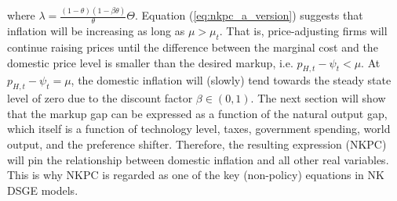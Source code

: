 where $\lambda = \frac{(1-\theta)(1-\beta \theta)}{\theta}\Theta$. Equation (\ref{eq:nkpc_a_version}) suggests that inflation will be increasing as long as $\mu > \mu_t$. That is, price-adjusting firms will continue raising prices until the difference between the marginal cost and the domestic price level is smaller than the desired markup, i.e. $p_{H,t} - \psi_t < \mu$. At $p_{H,t} - \psi_t = \mu$, the domestic inflation will (slowly) tend towards the steady state level of zero due to the discount factor $\beta \in (0,1)$. The next section will show that the markup gap can be expressed as a function of the natural output gap, which itself is a function of technology level, taxes, government spending, world output, and the preference shifter. Therefore, the resulting expression (NKPC) will pin the relationship between domestic inflation and all other real variables. This is why NKPC is regarded as one of the key (non-policy) equations in NK DSGE models.